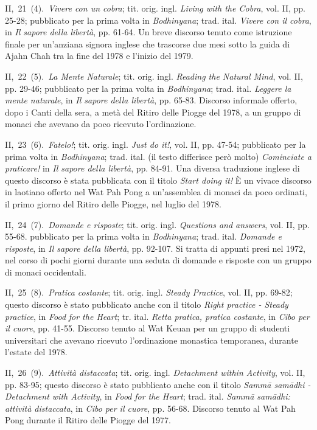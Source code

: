 II,~21~(4).~\emph{Vivere con un cobra}; tit. orig. ingl. \emph{Living
with the Cobra}, vol. II, pp. 25-28; pubblicato per la prima volta in
\emph{Bodhinyana}; trad. ital. \emph{Vivere con il cobra}, in \emph{Il
sapore della libertà}, pp. 61-64. Un breve discorso tenuto come
istruzione finale per un'anziana signora inglese che trascorse due mesi
sotto la guida di Ajahn Chah tra la fine del 1978 e l'inizio del 1979.

II,~22~(5).~\emph{La Mente Naturale}; tit. orig. ingl. \emph{Reading the
Natural Mind}, vol. II, pp. 29-46; pubblicato per la prima volta in
\emph{Bodhinyana}; trad. ital. \emph{Leggere la mente naturale}, in
\emph{Il sapore della libertà}, pp. 65-83. Discorso informale offerto,
dopo i Canti della sera, a metà del Ritiro delle Piogge del 1978, a un
gruppo di monaci che avevano da poco ricevuto l'ordinazione.

II,~23~(6).~\emph{Fatelo!}; tit. orig. ingl. \emph{Just do it!}, vol.
II, pp. 47-54; pubblicato per la prima volta in \emph{Bodhinyana}; trad.
ital. (il testo differisce però molto) \emph{Cominciate a praticare!} in
\emph{Il sapore della libertà}, pp. 84-91. Una diversa traduzione
inglese di questo discorso è stata pubblicata con il titolo \emph{Start
doing it!} È un vivace discorso in laotiano offerto nel Wat Pah Pong a
un'assemblea di monaci da poco ordinati, il primo giorno del Ritiro
delle Piogge, nel luglio del 1978.

II,~24~(7).~\emph{Domande e risposte}; tit. orig. ingl. \emph{Questions
and answers}, vol. II, pp. 55-68. pubblicato per la prima volta in
\emph{Bodhinyana}; trad. ital. \emph{Domande e risposte}, in \emph{Il
sapore della libertà}, pp. 92-107. Si tratta di appunti presi nel 1972,
nel corso di pochi giorni durante una seduta di domande e risposte con
un gruppo di monaci occidentali.

II,~25~(8).~\emph{Pratica costante}; tit. orig. ingl. \emph{Steady
Practice}, vol. II, pp. 69-82; questo discorso è stato pubblicato anche
con il titolo \emph{Right practice - Steady practice}, in \emph{Food}
\emph{for the Heart}; tr. ital. \emph{Retta pratica, pratica costante},
in \emph{Cibo per il cuore}, pp. 41-55. Discorso tenuto al Wat Keuan per
un gruppo di studenti universitari che avevano ricevuto l'ordinazione
monastica temporanea, durante l'estate del 1978.

II,~26~(9).~\emph{Attività distaccata}; tit. orig. ingl.
\emph{Detachment within Activity}, vol. II, pp. 83-95; questo discorso è
stato pubblicato anche con il titolo \emph{Sammā samādhi - Detachment
with Activity}, in \emph{Food} \emph{for the Heart}; trad. ital.
\emph{Sammā samādhi: attività distaccata}, in \emph{Cibo per il cuore},
pp. 56-68. Discorso tenuto al Wat Pah Pong durante il Ritiro delle
Piogge del 1977.

